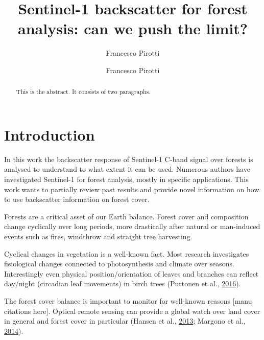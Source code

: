 \documentclass[]{elsarticle} %
\begin{document}
\begin{frontmatter}

  \title{Sentinel-1 backscatter for forest analysis: can we push the limit?}
    \author[CIRGEO Interdepartmental Research Center of Research of Geomatics]{Francesco Pirotti}
    \author[TESAF Department]{Francesco Pirotti}
      \address[CIRGEO Interdepartmental Research Center of Research of Geomatics]{Agripolis, University of Padova, Legnaro 35020, Italy}
    \address[TESAF Department]{University of Padova, Legnaro 35020, Italy}
  
  \begin{abstract}
  This is the abstract. It consists of two paragraphs.
  \end{abstract}
  
 \end{frontmatter}

\hypertarget{introduction}{%
\section{Introduction}\label{introduction}}

In this work the backscatter response of Sentinel-1 C-band signal over
forests is analysed to understand to what extent it can be used.
Numerous authors have investigated Sentinel-1 for forest analysis,
mostly in specific applications. This work wants to partially review
past results and provide novel information on how to use backscatter
information on forest cover.

Forests are a critical asset of our Earth balance. Forest cover and
composition change cyclically over long periods, more drastically after
natural or man-induced events such as fires, windthrow and straight tree
harvesting.

Cyclical changes in vegetation is a well-known fact. Most research
investigates fisiological changes connected to photosynthesis and
climate over seasons. Interestingly even physical position/orientation
of leaves and branches can reflect day/night (circadian leaf movements)
in birch trees (Puttonen et al.,
\protect\hyperlink{ref-Puttonen2016}{2016}).

The forest cover balance is important to monitor for well-known reasons
{[}manu citations here{]}. Optical remote sensing can provide a global
watch over land cover in general and forest cover in particular (Hansen
et al., \protect\hyperlink{ref-Hansen2013}{2013}; Margono et al.,
\protect\hyperlink{ref-Margono2014}{2014}).
\end{document}
